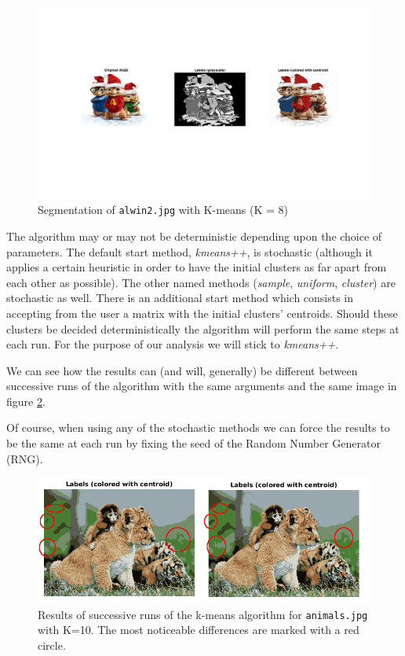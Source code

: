\begin{figure}[hbt]
\centering
\includegraphics[trim={50px 250px 50px 170px},clip,width=\textwidth]{img/kmeans/alwin2_k8_no_spatial.png}
\caption{Segmentation of \texttt{alwin2.jpg} with K-means (K = 8)}
\label{fig:alwin2-k8-no-spatial}
\end{figure}

The algorithm may or may not be deterministic depending upon the choice of
parameters. The default start method, \emph{kmeans++}, is
stochastic (although it
applies a certain heuristic in order to have the initial clusters as far
apart from each other as possible). The other named methods (\emph{sample}, \emph{uniform},
\emph{cluster}) are stochastic as well. There is an additional start
method which consists in accepting from the user a matrix with the initial
clusters' centroids. Should these clusters be decided deterministically
the algorithm will perform the same steps at each run. For the purpose
of our analysis we will stick to \emph{kmeans++}.

We can see how the results can (and will, generally) be different between
successive runs of the algorithm with the same
arguments and the same image in figure
\ref{fig:animals-k10-no-spatial-differences}.

Of course, when using any of the stochastic methods we can force the results to be the
same at each run by fixing the seed of the Random Number Generator (RNG).

\begin{figure}[hbt]
\centering
\includegraphics[width=\textwidth]{img/kmeans/animals_k10_no_spatial_differences.png}
\caption[Results of successive runs of the k-means algorithm for \texttt{animals.jpg} with K=10]
{Results of successive runs of the k-means algorithm for \texttt{animals.jpg} with K=10. The most noticeable differences are marked with a red circle.}
\label{fig:animals-k10-no-spatial-differences}
\end{figure}

